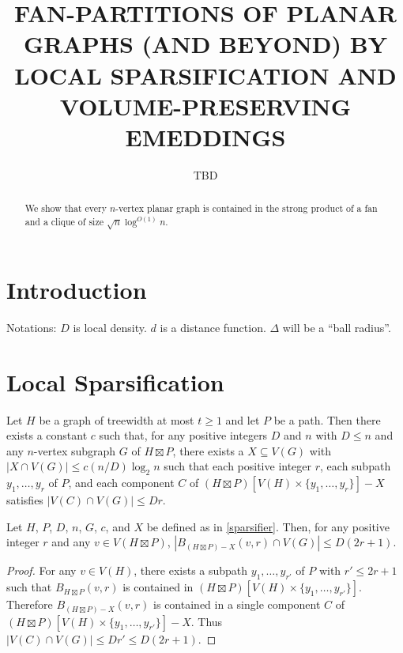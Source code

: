 \documentclass{patmorin}
\title{\MakeUppercase{Fan-Partitions of Planar Graphs (and Beyond)
  \newline by Local Sparsification and Volume-Preserving Emeddings}}
\author{TBD}
\date{}
\begin{document}
\maketitle

\begin{abstract}
  We show that every $n$-vertex planar graph is contained in the strong product of a fan and a clique of size $\sqrt{n}\log^{O(1)} n$.
\end{abstract}

\section{Introduction}


Notations: $D$ is local density.  $d$ is a distance function. $\Delta$ will be a ``ball radius''.

\section{Local Sparsification}

\begin{lem}\label{sparsifier}
  Let $H$ be a graph of treewidth at most $t\ge 1$ and let $P$ be a path.  Then there exists a constant $c$ such that, for any positive integers $D$ and $n$ with $D\le n$ and any $n$-vertex subgraph $G$ of $H\boxtimes P$, there exists a $X\subseteq V(G)$ with $|X\cap V(G)|\le c(n/D)\log_2 n$ such that each positive integer $r$, each subpath $y_1,\ldots,y_r$ of $P$, and each component $C$ of $(H\boxtimes P)[V(H)\times \{y_1,\ldots,y_r\}]-X$ satisfies $|V(C)\cap V(G)|\le Dr$.
\end{lem}



\begin{cor}
  Let $H$, $P$, $D$, $n$, $G$, $c$, and $X$ be defined as in \cref{sparsifier}.  Then, for any positive integer $r$ and any $v\in V(H\boxtimes P)$, $|B_{(H\boxtimes P)-X}(v,r)\cap V(G)|\le D(2r+1)$.
\end{cor}

\begin{proof}
  For any $v\in V(H)$, there exists a subpath $y_1,\ldots,y_{r'}$ of $P$ with $r'\le 2r+1$ such that $B_{H\boxtimes P}(v,r)$ is contained in $(H\boxtimes P)[V(H)\times \{y_1,\ldots,y_{r'}\}]$.  Therefore $B_{(H\boxtimes P)-X}(v,r)$ is contained in a single component $C$ of $(H\boxtimes P)[V(H)\times \{y_1,\ldots,y_{r'}\}]-X$.  Thus $|V(C)\cap V(G)|\le Dr'\le D(2r+1)$.
\end{proof}
\end{document}
